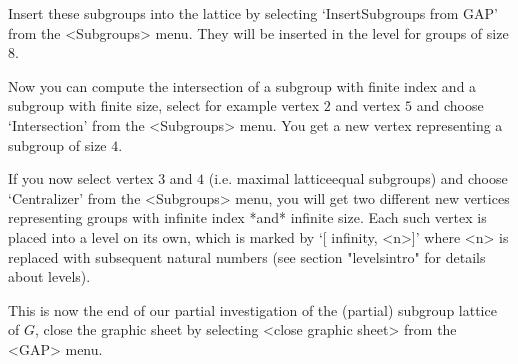 Insert these subgroups into the lattice by selecting
`InsertSubgroups from GAP' from the <Subgroups> menu. They will be
inserted in the level for groups of size 8.

Now you can compute the intersection of a subgroup with finite index
and a subgroup with finite size, select for example vertex $2$ and vertex
$5$ and choose `Intersection' from the <Subgroups> menu. You get a new 
vertex representing a subgroup of size $4$.

If you now select vertex $3$ and $4$ (i.e. maximal latticeequal
subgroups) and choose `Centralizer' from the <Subgroups> menu, you
will get two different new vertices representing groups with infinite
index *and* infinite size.  Each such vertex is placed into a level on
its own, which is marked by `[ infinity, <n>]' where <n> is replaced
with subsequent natural numbers (see section "levelsintro" for details
about levels).

%

This  is now  the end of   our partial investigation  of the (partial)
subgroup lattice  of $G$, close  the graphic sheet by selecting <close
graphic sheet> from the <GAP> menu.



